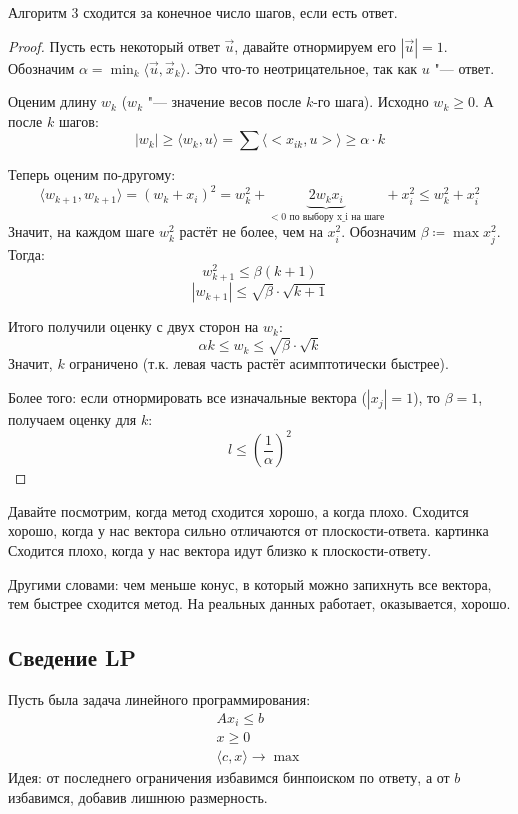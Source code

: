 \begin{theorem}
	Алгоритм 3 сходится за конечное число шагов, если есть ответ.
\end{theorem}
\begin{proof}
	Пусть есть некоторый ответ $\vec u$, давайте отнормируем его $|\vec u|=1$.
	Обозначим $\alpha = \min_k \langle \vec u, \vec x_k \rangle$.
	Это что-то неотрицательное, так как $u$ "--- ответ.

	Оценим длину $w_k$ ($w_k$ "--- значение весов после $k$-го шага).
	Исходно $w_k \ge 0$.
	А после $k$ шагов:
	\[ |w_k| \ge \langle w_k, u \rangle = \sum \langle<x_{ik}, u>\rangle \ge \alpha \cdot k \]

	Теперь оценим по-другому:
	\[ \langle w_{k+1}, w_{k+1} \rangle = (w_k + x_i)^2 = w_k^2 + \underbrace{2w_kx_i}_{<0\text{~по выбору x_i на шаге}} +x_i^2 \le w_k^2 + x_i^2 \]
	Значит, на каждом шаге $w_k^2$ растёт не более, чем на $x_i^2$.
	Обозначим $\beta \coloneq \max x_j^2$.
	Тогда:
	\[ w_{k+1}^2 \le \beta(k+1) \]
	\[ |w_{k+1}| \le \sqrt{\beta}\cdot\sqrt{k+1} \]

	Итого получили оценку с двух сторон на $w_k$:
	\[ \alpha k \le w_k \le \sqrt{\beta}\cdot \sqrt k \]
	Значит, $k$ ограничено (т.к. левая часть растёт асимптотически быстрее).

	Более того: если отнормировать все изначальные вектора ($|x_j|=1$),
	то $\beta=1$, получаем оценку для $k$:
	\[ l \le \left(\frac{1}{\alpha}\right)^2 \]
\end{proof}

Давайте посмотрим, когда метод сходится хорошо, а когда плохо.
Сходится хорошо, когда у нас вектора сильно отличаются от плоскости-ответа.
\TODO картинка
Сходится плохо, когда у нас вектора идут близко к плоскости-ответу.

Другими словами: чем меньше конус, в который можно запихнуть все вектора, тем быстрее сходится метод.
На реальных данных работает, оказывается, хорошо.

\subsection{Сведение LP}
	Пусть была задача линейного программирования:
	\begin{gather*}
		A x_i \le b \\
		x \ge 0 \\
		\langle c , x \rangle \to \max
	\end{gather*}
	Идея: от последнего ограничения избавимся бинпоиском по ответу, а от $b$ избавимся, добавив лишнюю размерность.

